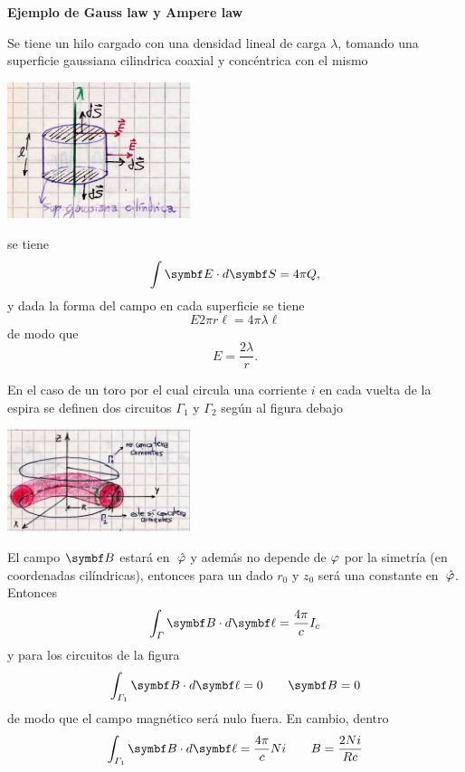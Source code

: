 \documentclass[10pt,oneside]{CBFT_book}
\begin{document}
\begin{ejemplo}{\bf Ejemplo de Gauss law y Ampere law}

Se tiene un hilo cargado con una densidad lineal de carga $ \lambda $, tomando una superficie gaussiana
cilindrica coaxial y concéntrica con el mismo 

\includegraphics[width=0.4\textwidth]{images/fig_ft1_gausslaw.jpg}

se tiene 
\[
	\int \vb{E}\cdot d\vb{S} = 4 \pi Q,
\]
y dada la forma del campo en cada superficie se tiene
\[
	E 2 \pi r \ell = 4 \pi \lambda \ell
\]
de modo que 
\[
	E = \frac{2 \lambda}{r}.
\]

En el caso de un toro por el cual circula una corriente $i$ en cada vuelta de la espira se definen dos
circuitos $\Gamma_1$ y $\Gamma_2$ según al figura debajo

\includegraphics[width=0.4\textwidth]{images/fig_ft1_amperelaw.jpg}

El campo $\vb{B}$ estará en $\:\hat{\varphi}$ y además no depende de $\varphi$ por la simetría (en coordenadas
cilíndricas), entonces para un dado $r_0$ y $z_0$ será una constante en $\:\hat{\varphi}$.
Entonces
\[
	\int_\Gamma \vb{B}\cdot d\vb{\ell} = \frac{4 \pi }{c} I_c
\]
y para los circuitos de la figura 
\[
	\int_{\Gamma_1} \vb{B}\cdot d\vb{\ell} = 0 \qquad \vb{B} = 0
\]
de modo que el campo magnético será nulo fuera. En cambio, dentro
\[
	\int_{\Gamma_1} \vb{B}\cdot d\vb{\ell} = \frac{4\pi}{c}Ni \qquad B = \frac{2Ni}{Rc}
\]


\end{ejemplo}
\end{document}
